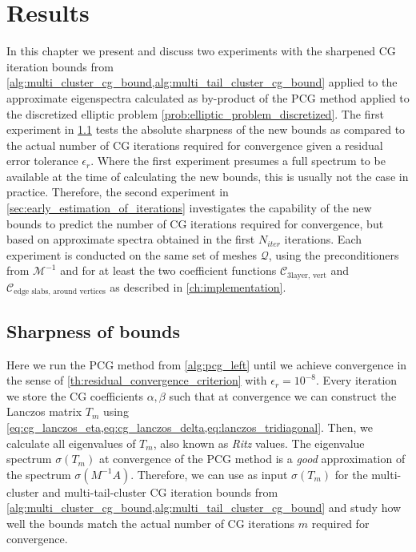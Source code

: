 \chapter{Results}\label{ch:results}
In this chapter we present and discuss two experiments with the sharpened CG iteration bounds from \cref{alg:multi_cluster_cg_bound,alg:multi_tail_cluster_cg_bound} applied to the approximate eigenspectra calculated as by-product of the PCG method applied to the discretized elliptic problem \cref{prob:elliptic_problem_discretized}. The first experiment in \cref{sec:sharpness_of_bounds} tests the absolute sharpness of the new bounds as compared to the actual number of CG iterations required for convergence given a residual error tolerance $\epsilon_r$. Where the first experiment presumes a full spectrum to be available at the time of calculating the new bounds, this is usually not the case in practice. Therefore, the second experiment in \cref{sec:early_estimation_of_iterations} investigates the capability of the new bounds to predict the number of CG iterations required for convergence, but based on approximate spectra obtained in the first $N_{iter}$ iterations. Each experiment is conducted on the same set of meshes $\mathcal{Q}$, using the preconditioners from $\mathcal{M}^{-1}$ and for at least the two coefficient functions $\mathcal{C}_{\text{3layer, vert}}$ and $\mathcal{C}_{\text{edge slabs, around vertices}}$ as described in \cref{ch:implementation}. 

\section{Sharpness of bounds}\label{sec:sharpness_of_bounds}
Here we run the PCG method from \cref{alg:pcg_left} until we achieve convergence in the sense of \cref{th:residual_convergence_criterion} with $\epsilon_r=10^{-8}$. Every iteration we store the CG coefficients $\alpha,\beta$ such that at convergence we can construct the Lanczos matrix $T_m$ using \cref{eq:cg_lanczos_eta,eq:cg_lanczos_delta,eq:lanczos_tridiagonal}. Then, we calculate all eigenvalues of $T_m$, also known as \textit{Ritz} values. The eigenvalue spectrum $\sigma(T_m)$ at convergence of the PCG method is a \textit{good} approximation of the spectrum $\sigma(M^{-1}A)$. Therefore, we can use as input $\sigma(T_m)$ for the multi-cluster and multi-tail-cluster CG iteration bounds from \cref{alg:multi_cluster_cg_bound,alg:multi_tail_cluster_cg_bound} and study how well the bounds match the actual number of CG iterations $m$ required for convergence. 

